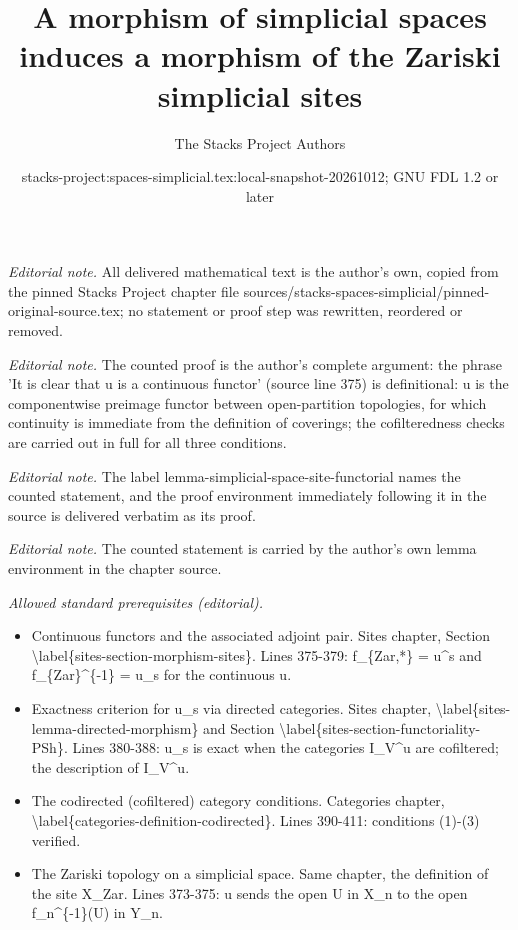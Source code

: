 \documentclass{stacks-project}
\title{A morphism of simplicial spaces induces a morphism of the Zariski simplicial sites}
\author{The Stacks Project Authors}
\date{stacks-project:spaces-simplicial.tex:local-snapshot-20261012; GNU FDL 1.2 or later}
\theoremstyle{plain}
\theoremstyle{definition}
\theoremstyle{remark}
\numberwithin{equation}{subsection}
\begin{document}
\maketitle
\noindent\textit{Editorial note.} All delivered mathematical text is the author's own, copied from the pinned Stacks Project chapter file sources/stacks-spaces-simplicial/pinned-original-source.tex; no statement or proof step was rewritten, reordered or removed.\par\medskip
\noindent\textit{Editorial note.} The counted proof is the author's complete argument: the phrase 'It is clear that u is a continuous functor' (source line 375) is definitional: u is the componentwise preimage functor between open-partition topologies, for which continuity is immediate from the definition of coverings; the cofilteredness checks are carried out in full for all three conditions.\par\medskip
\noindent\textit{Editorial note.} The label lemma-simplicial-space-site-functorial names the counted statement, and the proof environment immediately following it in the source is delivered verbatim as its proof.\par\medskip
\noindent\textit{Editorial note.} The counted statement is carried by the author's own lemma environment in the chapter source.\par\medskip
\noindent\textit{Allowed standard prerequisites (editorial).}\begin{itemize}
\item Continuous functors and the associated adjoint pair. Sites chapter, Section \textbackslash{}label\{sites-section-morphism-sites\}. Lines 375-379: f\_\{Zar,*\} = u\textasciicircum{}s and f\_\{Zar\}\textasciicircum{}\{-1\} = u\_s for the continuous u.
\item Exactness criterion for u\_s via directed categories. Sites chapter, \textbackslash{}label\{sites-lemma-directed-morphism\} and Section \textbackslash{}label\{sites-section-functoriality-PSh\}. Lines 380-388: u\_s is exact when the categories I\_V\textasciicircum{}u are cofiltered; the description of I\_V\textasciicircum{}u.
\item The codirected (cofiltered) category conditions. Categories chapter, \textbackslash{}label\{categories-definition-codirected\}. Lines 390-411: conditions (1)-(3) verified.
\item The Zariski topology on a simplicial space. Same chapter, the definition of the site X\_Zar. Lines 373-375: u sends the open U in X\_n to the open f\_n\textasciicircum{}\{-1\}(U) in Y\_n.
\end{itemize}\medskip
\end{document}
